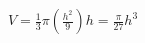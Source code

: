 \documentclass[preview]{standalone}
\begin{document}
\begin{align*}
V = \frac{1}{3}\pi \left(\frac{h^2}{9}\right) h = \frac{\pi}{27} h^3
\end{align*}
\end{document}
